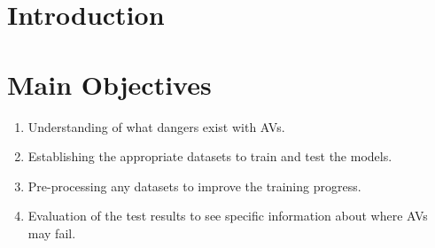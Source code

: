 \documentclass[a0,portrait]{a0poster}
\begin{document}
\begin{multicols}{2} %


	\color{ku} %

	\begin{abstract}

	\end{abstract}


	\color{DarkRed} %

	\section*{Introduction}
		


	\color{DarkSlateGray} %

	\section*{Main Objectives}
		\begin{enumerate}
			\item Understanding of what dangers exist with AVs.
			\item Establishing the appropriate datasets to train and test the models.
			\item Pre-processing any datasets to improve the training progress.
			\item Evaluation of the test results to see specific information about where AVs may fail.
		\end{enumerate}



\end{multicols}
\end{document}
